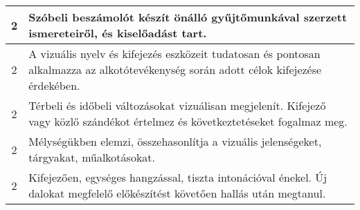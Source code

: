 \begin{longtable}{c | p{12cm} }
                                          2 &  Szóbeli beszámolót készít önálló gyűjtőmunkával szerzett ismereteiről, és kiselőadást tart. \\ \hline
                                          2 &  A vizuális nyelv és kifejezés eszközeit tudatosan és pontosan alkalmazza az alkotótevékenység során adott célok kifejezése érdekében. \\ \hline
                                          2 &  Térbeli és időbeli változásokat vizuálisan megjelenít. Kifejező vagy közlő szándékot értelmez és következtetéseket fogalmaz meg. \\ \hline
                                          2 &  Mélységükben elemzi, összehasonlítja a vizuális jelenségeket, tárgyakat, műalkotásokat. \\ \hline
                                          2 &  Kifejezően, egységes hangzással, tiszta intonációval énekel. Új dalokat megfelelő előkészítést követően hallás után megtanul. \\ \hline
                                      

\end{longtable}

